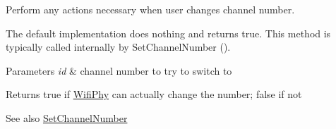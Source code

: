 Perform any actions necessary when user changes channel number. 

The default implementation does nothing and returns true. This method is typically called internally by Set\+Channel\+Number ().


\begin{DoxyParams}{Parameters}
{\em id} & channel number to try to switch to \\
\hline
\end{DoxyParams}
\begin{DoxyReturn}{Returns}
true if \hyperlink{classns3_1_1WifiPhy}{Wifi\+Phy} can actually change the number; false if not 
\end{DoxyReturn}
\begin{DoxySeeAlso}{See also}
\hyperlink{classns3_1_1WifiPhy_a2d13cf6ae4c185cae8516516afe4a32a}{Set\+Channel\+Number} 
\end{DoxySeeAlso}

